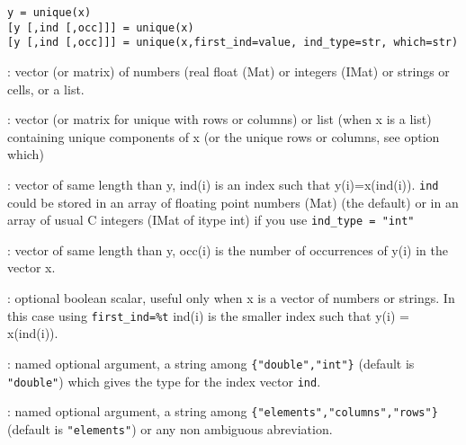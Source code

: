 
\begin{mandesc}
\end{mandesc}

\begin{calling_sequence}
\begin{verbatim}
y = unique(x)
[y [,ind [,occ]]] = unique(x)
[y [,ind [,occ]]] = unique(x,first_ind=value, ind_type=str, which=str)
\end{verbatim}
\end{calling_sequence}
\begin{parameters}
  \begin{varlist}
    : vector (or matrix) of numbers (real float (Mat) or integers
    (IMat) or strings or cells, or a list.

    : vector (or matrix for unique with rows or columns) or list (when
    x is a list) containing unique components of x (or the unique rows or
    columns, see option which)

    : vector of same length than y, ind(i) is an index such that
    y(i)=x(ind(i)). \verb+ind+ could be stored in an array of floating point
    numbers (Mat) (the default) or in an array of usual C integers (IMat of
    itype int) if you use \verb+ind_type = "int"+

    : vector of same length than y, occ(i) is the number of
    occurrences of y(i) in the vector x.

    : optional boolean scalar, useful only when x is a vector
    of numbers or strings. In this case using \verb!first_ind=%t! ind(i) is
    the smaller index such that y(i) = x(ind(i)).
    
    : named optional argument, a string among
    \verb+{"double","int"}+ (default is \verb+"double"+) which gives the type
    for the index vector \verb+ind+.

    : named optional argument, a string among
    \verb+{"elements","columns","rows"}+ (default is \verb+"elements"+) or any
    non ambiguous abreviation.
  \end{varlist}
\end{parameters}

